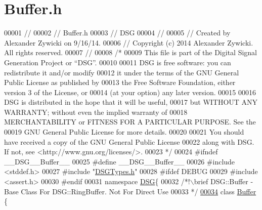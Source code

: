 \hypertarget{_buffer_8h_source}{\section{Buffer.\+h}
\label{_buffer_8h_source}
}

\begin{DoxyCode}
00001 \textcolor{comment}{//}
00002 \textcolor{comment}{//  Buffer.h}
00003 \textcolor{comment}{//  DSG}
00004 \textcolor{comment}{//}
00005 \textcolor{comment}{//  Created by Alexander Zywicki on 9/16/14.}
00006 \textcolor{comment}{//  Copyright (c) 2014 Alexander Zywicki. All rights reserved.}
00007 \textcolor{comment}{//}
00008 \textcolor{comment}{/*}
00009 \textcolor{comment}{ This file is part of the Digital Signal Generation Project or “DSG”.}
00010 \textcolor{comment}{}
00011 \textcolor{comment}{ DSG is free software: you can redistribute it and/or modify}
00012 \textcolor{comment}{ it under the terms of the GNU General Public License as published by}
00013 \textcolor{comment}{ the Free Software Foundation, either version 3 of the License, or}
00014 \textcolor{comment}{ (at your option) any later version.}
00015 \textcolor{comment}{}
00016 \textcolor{comment}{ DSG is distributed in the hope that it will be useful,}
00017 \textcolor{comment}{ but WITHOUT ANY WARRANTY; without even the implied warranty of}
00018 \textcolor{comment}{ MERCHANTABILITY or FITNESS FOR A PARTICULAR PURPOSE.  See the}
00019 \textcolor{comment}{ GNU General Public License for more details.}
00020 \textcolor{comment}{}
00021 \textcolor{comment}{ You should have received a copy of the GNU General Public License}
00022 \textcolor{comment}{ along with DSG.  If not, see <http://www.gnu.org/licenses/>.}
00023 \textcolor{comment}{ */}
00024 \textcolor{preprocessor}{#ifndef \_\_DSG\_\_Buffer\_\_}
00025 \textcolor{preprocessor}{#define \_\_DSG\_\_Buffer\_\_}
00026 \textcolor{preprocessor}{#include <stddef.h>}
00027 \textcolor{preprocessor}{#include "\hyperlink{_d_s_g_types_8h}{DSGTypes.h}"}
00028 \textcolor{preprocessor}{#ifdef DEBUG}
00029 \textcolor{preprocessor}{#include <assert.h>}
00030 \textcolor{preprocessor}{#endif}
00031 \textcolor{keyword}{namespace }\hyperlink{namespace_d_s_g}{DSG}\{\textcolor{comment}{}
00032 \textcolor{comment}{    /*!\(\backslash\)brief DSG::Buffer - Base Class For DSG::RingBuffer. Not For Direct Use}
00033 \textcolor{comment}{     */}
\hypertarget{_buffer_8h_source_l00034}{}\hyperlink{class_d_s_g_1_1_buffer}{00034}     \textcolor{keyword}{class }\hyperlink{class_d_s_g_1_1_buffer}{Buffer} \{

\end{DoxyCode}
